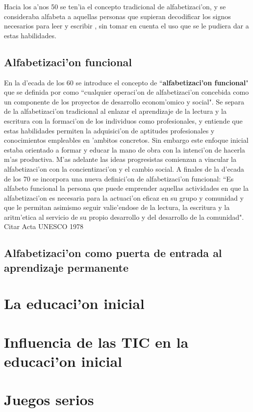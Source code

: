 Hacia los a'nos 50 se ten'ia el concepto tradicional de alfabetizaci'on, y se consideraba alfabeta 
a aquellas personas que supieran decodificar los signos necesarios para leer y escribir \cite{infante13}, sin tomar en cuenta el uso que se le pudiera dar a estas habilidades.

\subsection{Alfabetizaci'on funcional}
En la d'ecada de los 60 se introduce el concepto de ``\textbf{alfabetizaci'on funcional}" que se definida por \citet{Unesco1970} como ``cualquier operaci'on de alfabetizaci'on concebida como un componente de los proyectos de desarrollo econom'omico y social". Se separa de la alfabetizaci'on tradicional al enlazar el aprendizaje de la lectura y la escritura con la formaci'on de los individuos como profesionales, y entiende que estas habilidades permiten la adquisici'on de aptitudes profesionales y conocimientos empleables en 'ambitos concretos. Sin embargo este enfoque inicial estaba orientado a formar y educar la mano de obra con la intenci'on de hacerla m'as productiva. M'as adelante las ideas progresistas comienzan a vincular la alfabetizaci'on con la concientizaci'on y el cambio social. A finales de la d'ecada de los 70 se incorpora una nueva definici'on de alfabetizaci'on funcional: ``Es alfabeto funcional la persona que puede emprender aquellas actividades en que la alfabetizaci'on es necesaria para la actuaci'on eficaz en su grupo y comunidad y que le permitan asimismo seguir valie'endose de la lectura, la escritura y la aritm'etica al servicio de su propio desarrollo y del desarrollo de la comunidad". {\color{red} Citar Acta UNESCO 1978}

\subsection{Alfabetizaci'on como puerta de entrada al aprendizaje permanente}



\section{La educaci'on inicial}


\section{Influencia de las TIC en la educaci'on inicial}


\section{Juegos serios}




